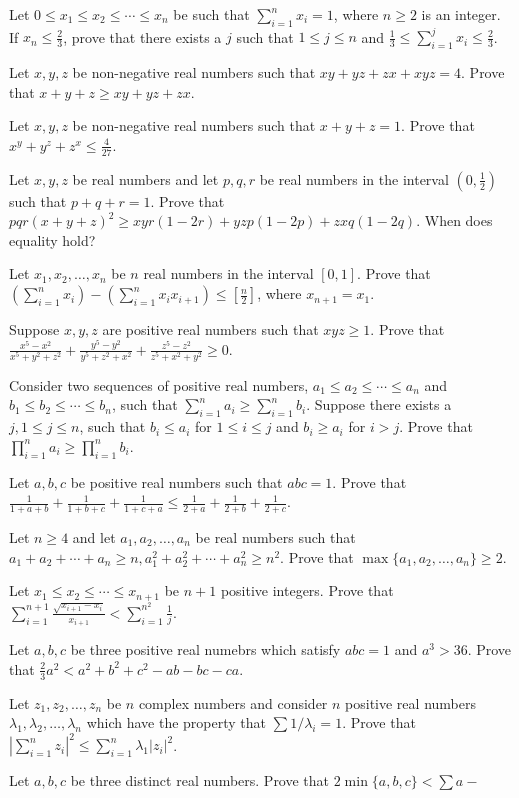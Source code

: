 \item Let $0\leq x_1\leq x_2\leq\cdots\leq x_n$ be such that $\displaystyle\sum_{i=1}^nx_i = 1$, where $n\geq 2$ is
  an integer. If $x_n\leq \frac{2}{3}$, prove that there exists a $j$ such that $1\leq j\leq n$ and
  $\displaystyle\frac{1}{3}\leq \sum_{i=1}^jx_i\leq \frac{2}{3}$.
\item Let $x, y, z$ be non-negative real numbers such that $xy + yz + zx + xyz = 4$. Prove that $x + y + z \geq xy
  + yz + zx$.
\item Let $x, y, z$ be non-negative real numbers such that $x + y + z = 1$. Prove that $x^y + y^z + z^x \leq
  \frac{4}{27}$.
\item Let $x, y, z$ be real numbers and let $p, q, r$ be real numbers in the interval $\left(0, \frac{1}{2}\right)$
  such that $p + q + r = 1$. Prove that $pqr(x + y + z)^2\geq xyr(1 - 2r) + yzp(1 - 2p) + zxq(1 - 2q)$. When does
  equality hold?
\item Let $x_1, x_2, \ldots, x_n$ be $n$ real numbers in the interval $[0, 1]$. Prove that
  $\displaystyle\left(\sum_{i = 1}^nx_i\right) - \left(\sum_{i=1}^nx_ix_{i + 1}\right)\leq
  \left[\frac{n}{2}\right]$, where $x_{n + 1} = x_1$.
\item Suppose $x, y, z$ are positive real numbers such that $xyz\geq 1$. Prove that $\frac{x^5 - x^2}{x^5 + y^2 +
  z^2} + \frac{y^5 - y^2}{y^5 + z^2 + x^2} + \frac{z^5 - z^2}{z^5 + x^2 + y^2}\geq 0$.
\item Consider two sequences of positive real numbers, $a_1\leq a_2\leq \cdots\leq a_n$ and $b_1\leq b_2\leq \cdots
  \leq b_n$, such that $\displaystyle\sum_{i=1}^na_i\geq\sum_{i=1}^nb_i$. Suppose there exists a $j, 1\leq j\leq
  n$, such that $b_i\leq a_i$ for $1\leq i\leq j$ and $b_i\geq a_i$ for $i > j$. Prove that
  $\displaystyle\prod_{i=1}^na_i\geq\prod_{i=1}^nb_i$.
\item Let $a, b, c$ be positive real numbers such that $abc = 1$. Prove that $\frac{1}{1 + a + b} + \frac{1}{1 + b
  + c} + \frac{1}{1 + c + a}\leq\frac{1}{2 + a} + \frac{1}{2 + b} + \frac{1}{2 + c}$.
\item Let $n\geq 4$ and let $a_1, a_2, \ldots, a_n$ be real numbers such that $a_1 + a_2 + \cdots + a_n\geq n,
  a_1^2 + a_2^2 + \cdots + a_n^2\geq n^2$. Prove that $\max\{a_1, a_2, \ldots, a_n\}\geq 2$.
\item Let $x_1\leq x_2\leq \cdots \leq x_{n + 1}$ be $n + 1$ positive integers. Prove that
  $\displaystyle\sum_{i=1}^{n + 1}\frac{\sqrt{x_{i +1} - x_i}}{x_{i + 1}}< \sum_{i=1}^{n^2}\frac{1}{j}$.
\item Let $a, b, c$ be three positive real numebrs which satisfy $abc = 1$ and $a^3 > 36$. Prove that
  $\frac{2}{3}a^2 < a^2 + b^2 + c^2 - ab - bc - ca$.
\item Let $z_1, z_2, \ldots, z_n$ be $n$ complex numbers and consider $n$ positive real numbers $\lambda_1,
  \lambda_2, \ldots, \lambda_n$ which have the property that $\sum 1/\lambda_i = 1$. Prove that
  $\displaystyle\left|\sum_{i=1}^nz_i\right|^2\leq\sum_{i=1}^n\lambda_1|z_i|^2$.
\item Let $a, b, c$ be three distinct real numbers. Prove that $2\min\{a, b, c\} <\sum a - $

